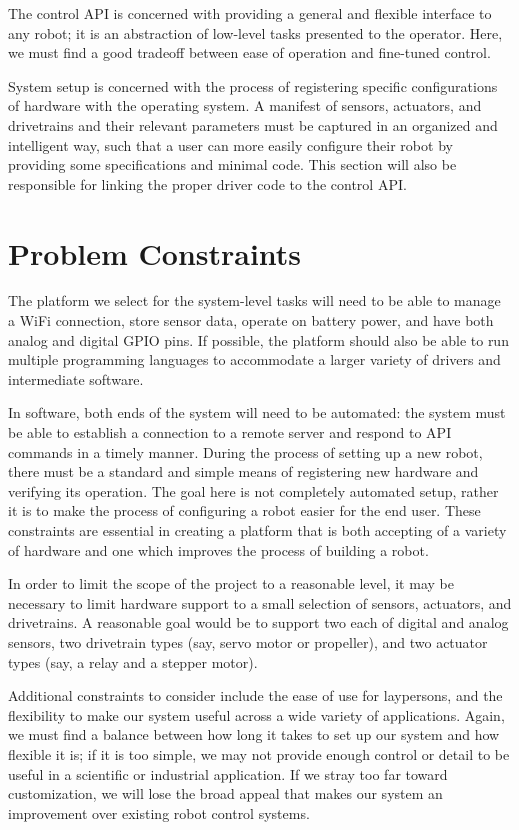\documentclass[10pt]{article}
\begin{document}
The control API is concerned with providing a general and flexible interface to any robot;  it is an abstraction of low-level tasks presented to the operator.  Here, we must find a good tradeoff between ease of operation and fine-tuned control.

System setup is concerned with the process of registering specific configurations of hardware with the operating system.  A manifest of sensors, actuators, and drivetrains and their relevant parameters must be captured in an organized and intelligent way, such that a user can more easily configure their robot by providing some specifications and minimal code.  This section will also be responsible for linking the proper driver code to the control API.

\section{Problem Constraints}
The platform we select for the system-level tasks will need to be able to manage a WiFi connection, store sensor data, operate on battery power, and have both analog and digital GPIO pins.  If possible, the platform should also be able to run multiple programming languages to accommodate a larger variety of drivers and intermediate software.

In software, both ends of the system will need to be automated: the system must be able to establish a connection to a remote server and respond to API commands in a timely manner.  During the process of setting up a new robot, there must be a standard and simple means of registering new hardware and verifying its operation.  The goal here is not completely automated setup, rather it is to make the process of configuring a robot easier for the end user.  These constraints are essential in creating a platform that is both accepting of a variety of hardware and one which improves the process of building a robot.

In order to limit the scope of the project to a reasonable level, it may be necessary to limit hardware support to a small selection of sensors, actuators, and drivetrains.  A reasonable goal would be to support two each of digital and analog sensors, two drivetrain types (say, servo motor or propeller), and two actuator types (say, a relay and a stepper motor).

Additional constraints to consider include the ease of use for laypersons, and the flexibility to make our system useful across a wide variety of applications.  Again, we must find a balance between how long it takes to set up our system and how flexible it is; if it is too simple, we may not provide enough control or detail to be useful in a scientific or industrial application.  If we stray too far toward customization, we will lose the broad appeal that makes our system an improvement over existing robot control systems.
\end{document}
